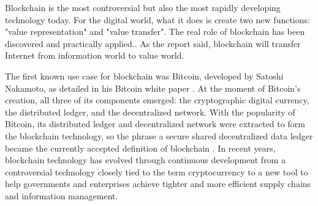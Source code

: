
Blockchain is the most controversial but also the most rapidly developing technology today\cite{Blockchaintechnologyprinciplesandapplications}. For the digital world, what it does is create two new functions: "value representation" and "value transfer". The real role of blockchain has been discovered and practically applied.\cite{Andolfatto2018}. As the report said\cite{FRIZZOBARKER2020102029}, blockchain will transfer Internet from information world to value world.

The first known use case for blockchain was Bitcoin, developed by Satoshi Nakamoto, as detailed in his Bitcoin white paper \cite{nakamoto2019bitcoin}. At the moment of Bitcoin's creation, all three of its components emerged: the cryptographic digital currency, the distributed ledger, and the decentralized network. With the popularity of Bitcoin, its distributed ledger and decentralized network were extracted to form the blockchain technology, so the phrase a secure shared decentralized data ledger became the currently accepted definition of blockchain \cite{Ammous2016}. In recent years, blockchain technology has evolved through continuous development from a controversial technology closely tied to the term cryptocurrency to a new tool to help governments and enterprises achieve tighter and more efficient supply chains and information management\cite{8343163}.

